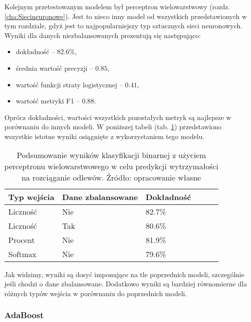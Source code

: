 Kolejnym przetestowanym modelem był perceptron wielowarstwowy (rozdz. \ref{cha:Siecineuronowe}). Jest to nieco inny model od wszystkich przedstawionych w tym rozdziale, gdyż jest to najpopularniejszy typ sztucznych sieci neuronowych. Wyniki dla danych niezbalansowanych prezentują się następująco:
\begin{itemize}
	\item dokładność – $82.6\%$,
	\item średnia wartość precyzji – $0.85$,
	\item wartość funkcji straty logistycznej – $0.41$,
	\item wartość metryki F1 – $0.88$.
\end{itemize}
Oprócz dokładności, wartości wszystkich pozostałych metryk są najlepsze w porównaniu do innych modeli.
W poniższej tabeli (tab. \ref{mlp.summary.table}) przedstawiono wszystkie istotne wyniki osiągnięte z wykorzystaniem tego modelu.
\begin{table}[!h]
	\centering
	\begin{threeparttable}
		\caption{Podsumowanie wyników klasyfikacji binarnej z użyciem perceptronu wielowarstwowego w celu predykcji wytrzymałości na rozciąganie odlewów. Źródło: opracowanie własne}
		\label{mlp.summary.table}
		\begin{tabularx}{1\textwidth}{ |X|X|X|X|X|X| }
		  \hline
		  \textbf{Typ wejścia} & \textbf{Dane zbalansowane} & \textbf{Dokładność}  \\
		  \hline

	          Liczność & Nie & 82.7\%\\
		  \hline

	          Liczność & Tak & 80.6\%\\
		  \hline

	          Procent & Nie & 81.9\%\\
		  \hline

	          Softmax & Nie & 79.6\%\\
		  \hline
		\end{tabularx}
	\end{threeparttable}
\end{table}
Jak widzimy, wyniki są dosyć imponujące na tle poprzednich modeli, szczególnie jeśli chodzi o dane zbalansowane. Dodatkowo wyniki są bardziej równomierne dla różnych typów wejścia w porównaniu do poprzednich modeli.

\subsubsection{AdaBoost}
\label{structures.with.AdaBoost}

